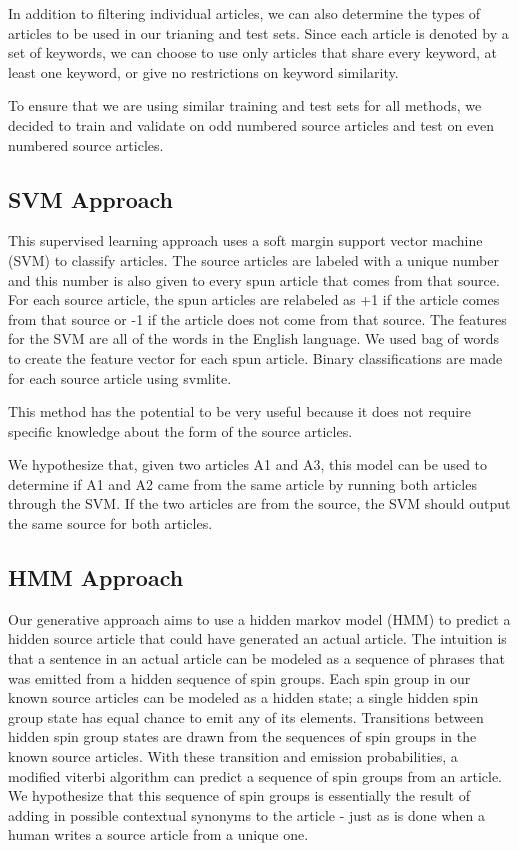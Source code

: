 \documentclass[11pt,letterpaper,oneside, titlepage]{scrartcl}
\begin{document}
In addition to filtering individual articles, we can also determine the types of articles to be used in our trianing and test sets. Since each article is denoted by a set of keywords, we can choose to use only articles that share every keyword, at least one keyword, or give no restrictions on keyword similarity.

To ensure that we are using similar training and test sets for all methods, we decided to train and validate on odd numbered source articles and test on even numbered source articles.


\subsection{SVM Approach}

This supervised learning approach uses a soft margin support vector machine (SVM) to classify articles. The source articles are labeled with a unique number and this number is also given to every spun article that comes from that source. For each source article, the spun articles are relabeled as +1 if the article comes from that source or -1 if the article does not come from that source. The features for the SVM are all of the words in the English language. We used bag of words to create the feature vector for each spun article. Binary classifications are made for each source article using svmlite.

This method has the potential to be very useful because it does not require specific knowledge about the form of the source articles.

We hypothesize that, given two articles A1 and A3, this model can be used to determine if A1 and A2 came from the same article by running both articles through the SVM. If the two articles are from the source, the SVM should output the same source for both articles.


\subsection{HMM Approach}

Our generative approach aims to use a hidden markov model (HMM) to predict a hidden source article that could have generated an actual article. The intuition is that a sentence in an actual article can be modeled as a sequence of phrases that was emitted from a hidden sequence of spin groups. Each spin group in our known source articles can be modeled as a hidden state; a single hidden spin group state has equal chance to emit any of its elements. Transitions between hidden spin group states are drawn from the sequences of spin groups in the known source articles. With these transition and emission probabilities, a modified viterbi algorithm can predict a sequence of spin groups from an article. We hypothesize that this sequence of spin groups is essentially the result of adding in possible contextual synonyms to the article - just as is done when a human writes a source article from a unique one.
\end{document}
